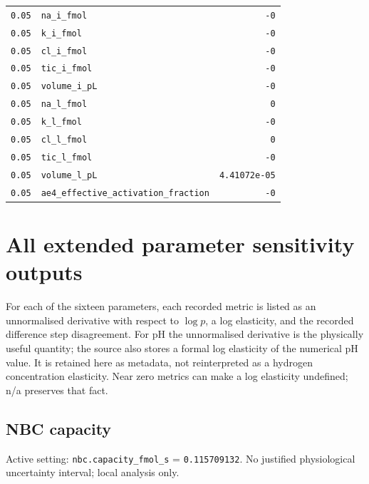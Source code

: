 \begin{longtable}{rlr}
\texttt{0.05} & \nolinkurl{na_i_fmol} & \texttt{-0} \\
\texttt{0.05} & \nolinkurl{k_i_fmol} & \texttt{-0} \\
\texttt{0.05} & \nolinkurl{cl_i_fmol} & \texttt{-0} \\
\texttt{0.05} & \nolinkurl{tic_i_fmol} & \texttt{-0} \\
\texttt{0.05} & \nolinkurl{volume_i_pL} & \texttt{-0} \\
\texttt{0.05} & \nolinkurl{na_l_fmol} & \texttt{0} \\
\texttt{0.05} & \nolinkurl{k_l_fmol} & \texttt{-0} \\
\texttt{0.05} & \nolinkurl{cl_l_fmol} & \texttt{0} \\
\texttt{0.05} & \nolinkurl{tic_l_fmol} & \texttt{-0} \\
\texttt{0.05} & \nolinkurl{volume_l_pL} & \texttt{4.41072e-05} \\
\texttt{0.05} & \nolinkurl{ae4_effective_activation_fraction} & \texttt{-0} \\
\end{longtable}
\endgroup




\section{All extended parameter sensitivity outputs}
For each of the sixteen parameters, each recorded metric is listed as an unnormalised derivative with respect to $\log p$, a log elasticity, and the recorded difference step disagreement. For pH the unnormalised derivative is the physically useful quantity; the source also stores a formal log elasticity of the numerical pH value. It is retained here as metadata, not reinterpreted as a hydrogen concentration elasticity. Near zero metrics can make a log elasticity undefined; n/a preserves that fact.
\subsection*{NBC capacity}
Active setting: \nolinkurl{nbc.capacity_fmol_s} = \texttt{0.115709132}. No justified physiological uncertainty interval; local analysis only.


